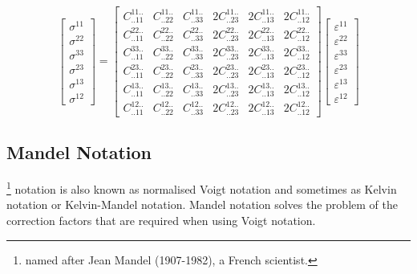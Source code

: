 \begin{equation}
  \begin{bmatrix}
    \sigma^{11} \\
    \sigma^{22} \\
    \sigma^{33} \\
    \sigma^{23} \\
    \sigma^{13} \\
    \sigma^{12}
  \end{bmatrix} = \begin{bmatrix}
    C^{11..}_{..11} & C^{11..}_{..22} & C^{11..}_{..33} & 2C^{11..}_{..23} & 2C^{11..}_{..13} & 2C^{11..}_{..12} \\
    C^{22..}_{..11} & C^{22..}_{..22} & C^{22..}_{..33} & 2C^{22..}_{..23} & 2C^{22..}_{..13} & 2C^{22..}_{..12} \\
    C^{33..}_{..11} & C^{33..}_{..22} & C^{33..}_{..33} & 2C^{33..}_{..23} & 2C^{33..}_{..13} & 2C^{33..}_{..12} \\
    C^{23..}_{..11} & C^{23..}_{..22} & C^{23..}_{..33} & 2C^{23..}_{..23} & 2C^{23..}_{..13} & 2C^{23..}_{..12} \\
    C^{13..}_{..11} & C^{13..}_{..22} & C^{13..}_{..33} & 2C^{13..}_{..23} & 2C^{13..}_{..13} & 2C^{13..}_{..12} \\
    C^{12..}_{..11} & C^{12..}_{..22} & C^{12..}_{..33} & 2C^{12..}_{..23} & 2C^{12..}_{..13} & 2C^{12..}_{..12}     
  \end{bmatrix} \begin{bmatrix}
    \varepsilon^{11} \\
    \varepsilon^{22} \\
    \varepsilon^{33} \\
    \varepsilon^{23} \\
    \varepsilon^{13} \\
    \varepsilon^{12}
  \end{bmatrix}
\end{equation}

\subsection{Mandel Notation}
\label{subsec:MathsNotationMandel}

\citet{Mandel:1965}\footnote{named after Jean
Mandel (1907-1982), a French scientist.} notation is also known as normalised
Voigt notation and sometimes as Kelvin notation or Kelvin-Mandel
notation. Mandel notation solves the problem of the correction factors
that are required when using Voigt notation.


